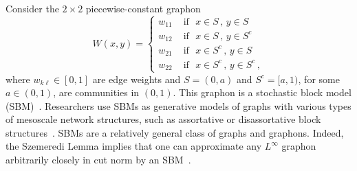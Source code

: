 \documentclass[11pt]{amsart}
\numberwithin{equation}{section}
\begin{document}
Consider the $2 \times 2$ piecewise-constant graphon
\begin{equation} \label{eq: sbm}
    W(x,y) = 
    \begin{cases}
        w_{11} &\text{ if } \,\, x \in S\,,\, y\in S \\
        w_{12} &\text{ if } \,\, x \in S\,,\, y\in S^c \\
        w_{21} &\text{ if } \,\, x \in S^c\,,\, y\in S \\
        w_{22} &\text{ if } \,\, x\in S^c\,,\, y\in S^c  \,,
    \end{cases}
\end{equation} 
where $w_{k \ell} \in [0,1]$ are edge weights and $S = (0, a)$ and $S^c = [a, 1)$, for some $a\in (0,1)$, are communities in $(0,1)$. This graphon is a stochastic block model (SBM)~\cite{newman2018}. Researchers use SBMs as generative models of graphs with various types of mesoscale network structures, such as assortative or disassortative block structures~\cite{peixoto2019}. SBMs are a relatively general class of graphs and graphons. Indeed, the Szemeredi Lemma implies that one can approximate any {$L^\infty$} graphon arbitrarily closely {in {cut norm} by an SBM~\cite[Lemma 3.1]{lovasz2007szemeredi}.} 
\end{document}
